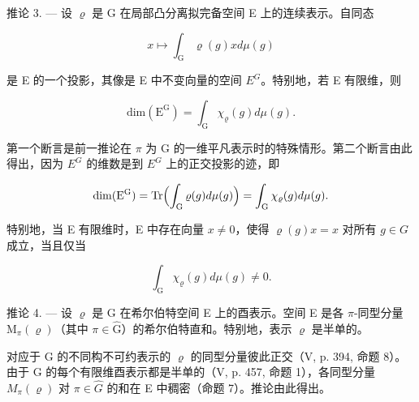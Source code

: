推论 3. --- 设 \(\varrho\) 是 G 在局部凸分离拟完备空间 E 上的连续表示。自同态

\[
x \mapsto \int_ {\mathrm{G}} \varrho (g) x d \mu (g)
\]

是 E 的一个投影，其像是 E 中不变向量的空间 \(E^{G}\)。特别地，若 E 有限维，则

\[
\mathrm{dim} (\mathrm{E} ^ {\mathrm{G}}) = \int_ {\mathrm{G}} \chi_ {\varrho} (g) d \mu (g).
\]

第一个断言是前一推论在 \(\pi\) 为 G 的一维平凡表示时的特殊情形。第二个断言由此得出，因为 \(E^{G}\) 的维数是到 \(E^{G}\) 上的正交投影的迹，即

\[
\mathrm{dim} (\mathrm{E} ^ {\mathrm{G}}) = \mathrm{Tr} \Bigl (\int_ {\mathrm{G}} \varrho (g) d \mu (g) \Bigr) = \int_ {\mathrm{G}} \chi_ {\varrho} (g) d \mu (g).
\]

特别地，当 E 有限维时，E 中存在向量 \(x \neq 0\)，使得 \(\varrho(g)x = x\) 对所有 \(g \in G\) 成立，当且仅当

\[
\int_ {\mathrm{G}} \chi_ {\varrho} (g) d \mu (g) \neq 0.
\]

推论 4. --- 设 \(\varrho\) 是 G 在希尔伯特空间 E 上的酉表示。空间 E 是各 \(\pi\)-同型分量 \(\mathrm{M}_{\pi}(\varrho)\)（其中 \(\pi \in \widehat{\mathrm{G}}\)）的希尔伯特直和。特别地，表示 \(\varrho\) 是半单的。

对应于 G 的不同构不可约表示的 \(\varrho\) 的同型分量彼此正交（V, p. 394, 命题 8）。由于 G 的每个有限维酉表示都是半单的（V, p. 457, 命题 1），各同型分量 \(M_{\pi}(\varrho)\) 对 \(\pi \in \widehat{G}\) 的和在 E 中稠密（命题 7）。推论由此得出。